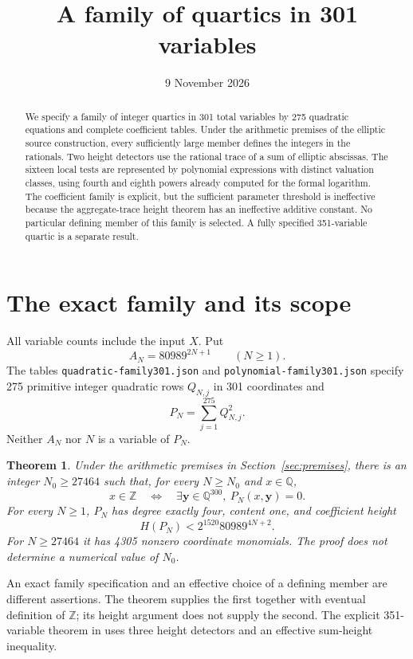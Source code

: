 \documentclass[11pt,a4paper]{article}
\title{A family of quartics in 301 variables}
\author{}\date{9 November 2026}
\newtheorem{theorem}{Theorem}[section]
\theoremstyle{remark}\newtheorem{remark}[theorem]{Remark}
\newcommand{\Q}{\mathbb Q}\newcommand{\Z}{\mathbb Z}\newcommand{\HH}{\mathcal H}
\begin{document}
\maketitle
\begin{abstract}
We specify a family of integer quartics in 301 total variables by 275
quadratic equations and complete coefficient tables. Under the arithmetic
premises of the elliptic source construction, every sufficiently large
member defines the integers in the rationals. Two height detectors use
the rational trace of a sum of elliptic abscissas. The sixteen local tests
are represented by polynomial expressions with distinct valuation classes,
using fourth and eighth powers already computed for the formal logarithm.
The coefficient family is explicit, but the sufficient parameter threshold
is ineffective because the aggregate-trace height theorem has an
ineffective additive constant. No particular defining member of this
family is selected. A fully specified 351-variable quartic is a separate
result.
\end{abstract}

\section{The exact family and its scope}
All variable counts include the input $X$. Put
\[
                     A_N=80989^{2N+1}\qquad(N\ge1).
\]
The tables \nolinkurl{quadratic-family301.json} and
\nolinkurl{polynomial-family301.json} specify 275 primitive integer
quadratic rows $Q_{N,j}$ in 301 coordinates and
\[
                           P_N=\sum_{j=1}^{275}Q_{N,j}^2.
\]
Neither $A_N$ nor $N$ is a variable of $P_N$.

\begin{theorem}\label{thm:main}
Under the arithmetic premises in Section~\ref{sec:premises}, there is
an integer $N_0\ge27464$ such that, for every $N\ge N_0$ and $x\in\Q$,
\[
 x\in\Z\quad\Longleftrightarrow\quad
 \exists\boldsymbol y\in\Q^{300},\ P_N(x,\boldsymbol y)=0.
\]
For every $N\ge1$, $P_N$ has degree exactly four, content one, and
coefficient height
\[
                           H(P_N)<2^{1520}80989^{4N+2}.
\]
For $N\ge27464$ it has 4305 nonzero coordinate monomials.
The proof does not determine a numerical value of $N_0$.
\end{theorem}

An exact family specification and an effective choice of a defining
member are different assertions. The theorem supplies the first together
with eventual definition of $\Z$; its height argument does not supply
the second. The explicit 351-variable theorem in \cite{Explicit} uses
three height detectors and an effective sum-height inequality.
\end{document}
